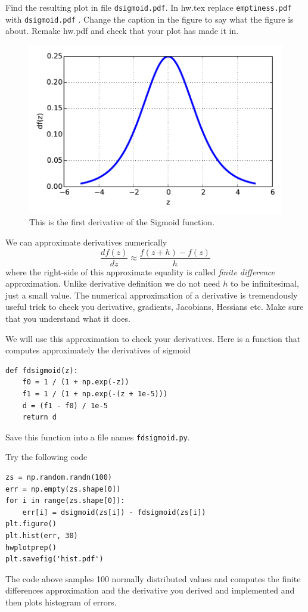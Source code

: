\documentclass{article}
\begin{document}
Find the resulting plot in file {\tt dsigmoid.pdf}. In hw\theHW.tex replace {\tt emptiness.pdf} with {\tt dsigmoid.pdf} . Change the
caption in the figure to say what the figure is about. Remake hw\theHW.pdf and check that your plot has made it in.
\begin{figure}[H]
\begin{center}
\includegraphics[scale=0.5]{dsigmoid.pdf}
\caption{This is the first derivative of the Sigmoid function.}
\end{center}
\end{figure}


\newproblem{1pt}
We can approximate derivatives numerically
\[
\frac{df(z)}{dz}\approx \frac{f(z+h) - f(z)}{h}
\]
where the right-side of this approximate equality is called {\em finite difference} approximation. Unlike derivative definition we do not need $h$ to be infinitesimal, just a small value. The numerical approximation of a derivative is tremendously useful trick to check you derivative, gradients, Jacobians, Hessians etc. Make sure that you understand what it does.

We will use this approximation to check your derivatives. Here is a function that computes approximately the derivatives of sigmoid
\begin{lstlisting}
def fdsigmoid(z):
    f0 = 1 / (1 + np.exp(-z))
    f1 = 1 / (1 + np.exp(-(z + 1e-5)))
    d = (f1 - f0) / 1e-5
    return d
\end{lstlisting}
Save this function into a file names \texttt{fdsigmoid.py}.

Try the following code
\begin{lstlisting}
zs = np.random.randn(100)
err = np.empty(zs.shape[0])
for i in range(zs.shape[0]):
    err[i] = dsigmoid(zs[i]) - fdsigmoid(zs[i])
plt.figure()
plt.hist(err, 30)
hwplotprep()
plt.savefig('hist.pdf')
\end{lstlisting}
The code above samples 100 normally distributed values and computes the finite differences approximation and the derivative you derived and implemented and then plots histogram of errors.
\end{document}
